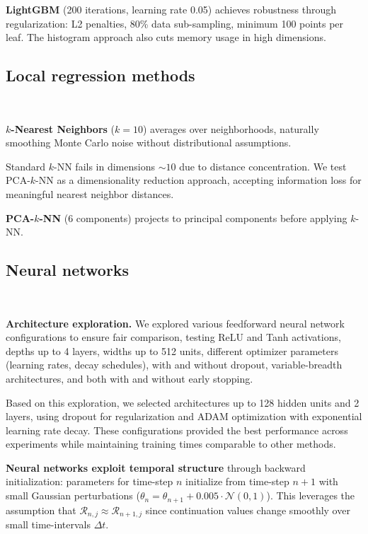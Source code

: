 \documentclass[11pt,reqno,a4paper]{amsart}
\theoremstyle{definition}
\numberwithin{equation}{section}
\DeclareMathOperator{\1}{\mathbbm{1}}
\begin{document}
\textbf{LightGBM} (200 iterations, learning rate 0.05) achieves robustness through regularization: L2 penalties, 80\% data sub-sampling, minimum 100 points per leaf. The histogram approach also cuts memory usage in high dimensions.

\subsection{Local regression methods}
\

\textbf{$k$-Nearest Neighbors} ($k=10$) averages over neighborhoods, naturally smoothing Monte Carlo noise without distributional assumptions. 

Standard $k$-NN fails in dimensions $\sim 10$ due to distance concentration. We test PCA-$k$-NN as a dimensionality reduction approach, accepting information loss for meaningful nearest neighbor distances.

\textbf{PCA-$k$-NN} (6 components) projects to principal components before applying $k$-NN.

\subsection{Neural networks}
\

\textbf{Architecture exploration.}  We explored various feedforward neural network configurations to ensure fair comparison, testing ReLU and Tanh activations, depths up to 4 layers, widths up to 512 units, different optimizer parameters (learning rates, decay schedules), with and without dropout, variable-breadth architectures, and both with and without early stopping.

Based on this exploration, we selected architectures up to 128 hidden units and 2 layers, using dropout for regularization and ADAM optimization with exponential learning rate decay. These configurations provided the best performance across experiments while maintaining training times comparable to other methods.

\textbf{Neural networks exploit temporal structure} through backward initialization: parameters for time-step $n$ initialize from time-step $n+1$ with small Gaussian perturbations ($\theta_n = \theta_{n+1} + 0.005 \cdot \mathcal{N}(0,1)$). This leverages the assumption that $\mathcal{R}_{n,j} \approx \mathcal{R}_{n+1,j}$ since continuation values change smoothly over small time-intervals $\Delta t$.
\end{document}
